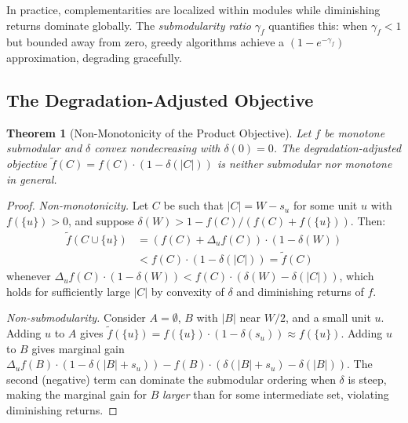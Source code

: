 \documentclass[11pt, a4paper, logo, copyright]{googledeepmind}
\newtheorem{theorem}{Theorem}[section]
\begin{document}
In practice, complementarities are localized within modules while diminishing returns dominate globally. The \emph{submodularity ratio} $\gamma_f$ \citep{das2011submodular} quantifies this: when $\gamma_f < 1$ but bounded away from zero, greedy algorithms achieve a $(1 - e^{-\gamma_f})$ approximation, degrading gracefully.

\subsection{The Degradation-Adjusted Objective}

\begin{theorem}[Non-Monotonicity of the Product Objective]
\label{thm:nonmonotone}
Let $f$ be monotone submodular and $\delta$ convex nondecreasing with $\delta(0) = 0$. The degradation-adjusted objective $\tilde{f}(C) = f(C) \cdot (1 - \delta(|C|))$ is neither submodular nor monotone in general.
\end{theorem}

\begin{proof}
\emph{Non-monotonicity.} Let $C$ be such that $|C| = W - s_u$ for some unit $u$ with $f(\{u\}) > 0$, and suppose $\delta(W) > 1 - f(C)/(f(C) + f(\{u\}))$. Then:
\begin{align*}
\tilde{f}(C \cup \{u\}) &= (f(C) + \Delta_u f(C)) \cdot (1 - \delta(W)) \\
&< f(C) \cdot (1 - \delta(|C|)) = \tilde{f}(C)
\end{align*}
whenever $\Delta_u f(C) \cdot (1 - \delta(W)) < f(C) \cdot (\delta(W) - \delta(|C|))$, which holds for sufficiently large $|C|$ by convexity of $\delta$ and diminishing returns of $f$.

\emph{Non-submodularity.} Consider $A = \emptyset$, $B$ with $|B|$ near $W/2$, and a small unit $u$. Adding $u$ to $A$ gives $\tilde{f}(\{u\}) = f(\{u\}) \cdot (1 - \delta(s_u)) \approx f(\{u\})$. Adding $u$ to $B$ gives marginal gain $\Delta_u f(B) \cdot (1 - \delta(|B| + s_u)) - f(B) \cdot (\delta(|B|+s_u) - \delta(|B|))$. The second (negative) term can dominate the submodular ordering when $\delta$ is steep, making the marginal gain for $B$ \emph{larger} than for some intermediate set, violating diminishing returns.
\end{proof}
\end{document}
